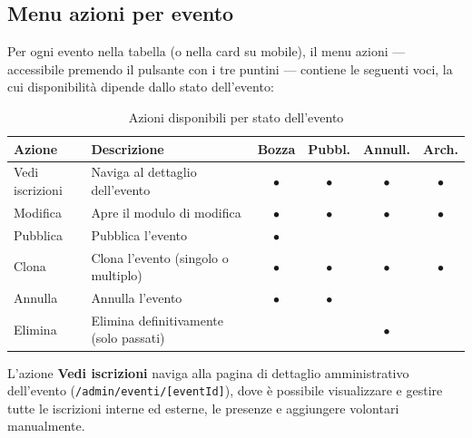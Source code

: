 \documentclass[a4paper,11pt,oneside]{book}
\newcommand{\percorso}[1]{\textcolor{namoCyan}{\texttt{#1}}}
\begin{document}
\subsection{Menu azioni per evento}

Per ogni evento nella tabella (o nella card su mobile), il menu azioni --- accessibile premendo il pulsante con i tre puntini --- contiene le seguenti voci, la cui disponibilit\`a dipende dallo stato dell'evento:

\begin{table}[htbp]
\centering
\caption{Azioni disponibili per stato dell'evento}
\label{tab:azioni-per-stato}
\begin{tabularx}{\textwidth}{l X c c c c}
\toprule
\textbf{Azione} & \textbf{Descrizione} & \textbf{Bozza} & \textbf{Pubbl.} & \textbf{Annull.} & \textbf{Arch.} \\
\midrule
Vedi iscrizioni & Naviga al dettaglio dell'evento                 & $\bullet$ & $\bullet$ & $\bullet$ & $\bullet$ \\
Modifica        & Apre il modulo di modifica                       & $\bullet$ & $\bullet$ & $\bullet$ & $\bullet$ \\
Pubblica        & Pubblica l'evento                                & $\bullet$ &           &           &           \\
Clona           & Clona l'evento (singolo o multiplo)              & $\bullet$ & $\bullet$ & $\bullet$ & $\bullet$ \\
Annulla         & Annulla l'evento                                 & $\bullet$ & $\bullet$ &           &           \\
Elimina         & Elimina definitivamente (solo passati)           &           &           & $\bullet$ &           \\
\bottomrule
\end{tabularx}
\end{table}

\begin{infobox}
L'azione \textbf{Vedi iscrizioni} naviga alla pagina di dettaglio amministrativo dell'evento (\percorso{/admin/eventi/[eventId]}), dove \`e possibile visualizzare e gestire tutte le iscrizioni interne ed esterne, le presenze e aggiungere volontari manualmente.
\end{infobox}
\end{document}

